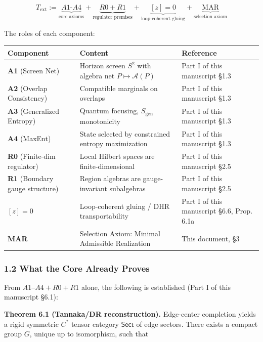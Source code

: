 \[T_{\mathrm{ext}} := \underbrace{A1\text{-}A4}_{\text{core axioms}} + \underbrace{R0 + R1}_{\text{regulator premises}} + \underbrace{[z]=0}_{\text{loop-coherent gluing}} + \underbrace{\text{MAR}}_{\text{selection axiom}}\]

The roles of each component:

{\def\LTcaptype{none} %
\begin{longtable}[]{@{}>{\RaggedRight\arraybackslash}p{}>{\RaggedRight\arraybackslash}p{}>{\RaggedRight\arraybackslash}p{}@{}}
\toprule\noalign{}
Component & Content & Reference \\
\midrule\noalign{}
\endhead
\bottomrule\noalign{}
\endlastfoot
\textbf{A1} (Screen Net) & Horizon screen \(S^2\) with algebra net \(P \mapsto \mathcal{A}(P)\) & Part I of this manuscript §1.3 \\
\textbf{A2} (Overlap Consistency) & Compatible marginals on overlaps & Part I of this manuscript §1.3 \\
\textbf{A3} (Generalized Entropy) & Quantum focusing, \(S_{\mathrm{gen}}\) monotonicity & Part I of this manuscript §1.3 \\
\textbf{A4} (MaxEnt) & State selected by constrained entropy maximization & Part I of this manuscript §1.3 \\
\textbf{R0} (Finite-dim regulator) & Local Hilbert spaces are finite-dimensional & Part I of this manuscript §2.5 \\
\textbf{R1} (Boundary gauge structure) & Region algebras are gauge-invariant subalgebras & Part I of this manuscript §2.5 \\
\textbf{\([z]=0\)} & Loop-coherent gluing / DHR transportability & Part I of this manuscript §6.6, Prop. 6.1a \\
\textbf{MAR} & Selection Axiom: Minimal Admissible Realization & This document, §3 \\
\end{longtable}
}

\subsubsection{1.2 What the Core Already Proves}\label{12-what-the-core-already-proves}

From \(A1\)--\(A4 + R0 + R1\) alone, the following is established (Part I of this manuscript §6.1):

\textbf{Theorem 6.1 (Tannaka/DR reconstruction).} Edge-center completion yields a rigid symmetric \(C^*\) tensor category \(\mathsf{Sect}\) of edge sectors. There exists a compact group \(G\), unique up to isomorphism, such that

